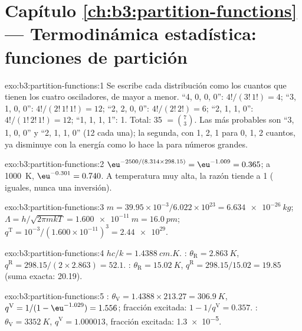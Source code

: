 \section*{Capítulo \ref{ch:b3:partition-functions} --- Termodinámica estadística: funciones de partición}

\begin{solution}{exo:b3:partition-functions:1}
Se escribe cada distribución como los cuantos que tienen los cuatro osciladores, de mayor
a menor. ``4, 0, 0, 0'': $4!/(3!\,1!) = 4$; ``3, 1, 0, 0'': $4!/(2!\,1!\,1!) = 12$; ``2, 2, 0, 0'':
$4!/(2!\,2!) = 6$; ``2, 1, 1, 0'': $4!/(1!\,2!\,1!) = 12$; ``1, 1, 1, 1'': 1. Total: 35 $= \binom73$.
Las más probables son ``3, 1, 0, 0'' y ``2, 1, 1, 0'' (12 cada una); la segunda, con
 1, 2, 1 para 0, 1, 2 cuantos, ya disminuye con la energía como lo hace la
 para números grandes.
\end{solution}

\begin{solution}{exo:b3:partition-functions:2}
$\eu^{-2500/(8.314 \times 298.15)} = \eu^{-1.009} = 0.365$; a \qty{1000}{K}, $\eu^{-0.301} = 0.740$. A temperatura
muy alta, la razón tiende a 1 ( iguales, nunca una inversión).
\end{solution}

\begin{solution}{exo:b3:partition-functions:3}
$m = 39.95\times10^{-3}/6.022\times10^{23} = \qty{6.634e-26}{kg}$; $\Lambda = h/\sqrt{2\pi mkT} =
\qty{1.600e-11}{m} = \qty{16.0}{pm}$; $q^{\mathrm T} = 10^{-3}/(1.600\times10^{-11})^3 = \num{2.44e29}$.
\end{solution}

\begin{solution}{exo:b3:partition-functions:4}
$hc/k = \qty{1.4388}{cm.K}$. : $\theta_{\mathrm R} = \qty{2.863}{K}$, $q^{\mathrm R} = 298.15/(2 \times 2.863) = 52.1$.
: $\theta_{\mathrm R} = \qty{15.02}{K}$, $q^{\mathrm R} = 298.15/15.02 = 19.85$ (suma exacta: 20.19).
\end{solution}

\begin{solution}{exo:b3:partition-functions:5}
: $\theta_{\mathrm V} = 1.4388 \times 213.27 = \qty{306.9}{K}$, $q^{\mathrm V} = 1/(1 - \eu^{-1.029}) = 1.556$;
fracción excitada: $1 - 1/q^{\mathrm V} = 0.357$. : $\theta_{\mathrm V} = \qty{3352}{K}$, $q^{\mathrm V} = 1.000013$,
fracción excitada: \num{1.3e-5}.
\end{solution}

